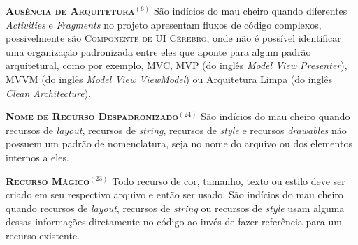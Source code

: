   \noindent
  \textsc{\textbf{{\small Ausência de Arquitetura}}}$^{(6)}$ São indícios do mau cheiro quando diferentes \textit{Activities} e \textit{Fragments} no projeto apresentam fluxos de código complexos, possivelmente são \textsc{\small Componente de UI Cérebro}, onde não é possível identificar uma organização padronizada entre eles que aponte para algum padrão arquitetural, como por exemplo, MVC, MVP (do inglês \textit{Model View Presenter}), MVVM (do inglês \textit{Model View ViewModel}) ou Arquitetura Limpa (do inglês \textit{Clean Architecture}).

    

  \noindent
  \textbf{\textsc{{\small Nome de Recurso Despadronizado}}}$^{(24)}$
      São indícios do mau cheiro quando recursos de \textit{layout}, recursos de \textit{string}, recursos de \textit{style} e recursos \textit{drawables} não possuem um padrão de nomenclatura, seja no nome do arquivo ou dos elementos internos a eles.



  \noindent
  \textbf{\textsc{{\small Recurso Mágico}}}$^{(23)}$
      Todo recurso de cor, tamanho, texto ou estilo deve ser criado em seu respectivo arquivo e então ser usado. São indícios do mau cheiro quando recursos de \textit{layout}, recursos de \textit{string} ou recursos de \textit{style} usam alguma dessas informações diretamente no código ao invés de fazer referência para um recurso existente.

